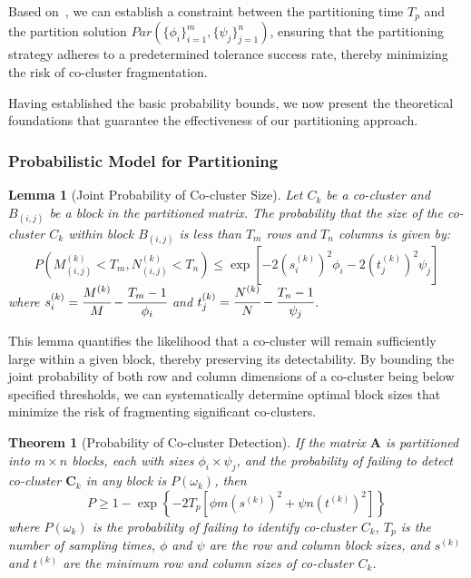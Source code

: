 \documentclass[journal]{IEEEtran}
\newtheorem{theorem}{Theorem}
\newtheorem{lemma}{Lemma}
\begin{document}
Based on~, we can establish a constraint between the partitioning time $T_p$ and the partition solution $Par(\{\phi_i\}_{i=1}^m, \{\psi_j\}_{j=1}^n)$, ensuring that the partitioning strategy adheres to a predetermined tolerance success rate, thereby minimizing the risk of co-cluster fragmentation.

Having established the basic probability bounds, we now present the theoretical foundations that guarantee the effectiveness of our partitioning approach.

\subsubsection{Probabilistic Model for Partitioning}
\label{subsec:probabilistic_model}
\begin{lemma}[Joint Probability of Co-cluster Size]
    \label{thm:joint_probability}
    Let $C_k$ be a co-cluster and $B_{(i,j)}$ be a block in the partitioned matrix. The probability that the size of the co-cluster $C_k$ within block $B_{(i,j)}$ is less than $T_m$ rows and $T_n$ columns is given by:
    \begin{equation}
        P(M_{(i,j)}^{(k)} < T_m, N_{(i,j)}^{(k)} < T_n) \leq \exp\left[-2 (s_i^{(k)})^2 \phi_i -2 (t_j^{(k)})^2 \psi_j\right]
    \end{equation}
    where $s_i^{(k)} = \cfrac{M^{(k)}}{M} - \cfrac{T_m-1}{\phi_i}$ and $t_j^{(k)} = \cfrac{N^{(k)}}{N} - \cfrac{T_n-1}{\psi_j}$.
\end{lemma}

This lemma quantifies the likelihood that a co-cluster will remain sufficiently large within a given block, thereby preserving its detectability. By bounding the joint probability of both row and column dimensions of a co-cluster being below specified thresholds, we can systematically determine optimal block sizes that minimize the risk of fragmenting significant co-clusters.

\begin{theorem}[Probability of Co-cluster Detection]
    \label{thm:probability_co_cluster_detection}
    If the matrix $\mathbf{A}$ is partitioned into $m \times n$ blocks, each with sizes $\phi_i \times \psi_j$, and the probability of failing to detect co-cluster $\mathbf{C}_k$ in any block is $P(\omega_k)$, then
    \begin{equation}
        P \geq 1 - \exp \left\{ -2 T_p \left[ \phi m (s^{(k)})^2 + \psi n (t^{(k)})^2 \right] \right\}
    \end{equation}
    where $P(\omega_k)$ is the probability of failing to identify co-cluster $C_k$, $T_p$ is the number of sampling times, $\phi$ and $\psi$ are the row and column block sizes, and $s^{(k)}$ and $t^{(k)}$ are the minimum row and column sizes of co-cluster $C_k$.
\end{theorem}
\end{document}
